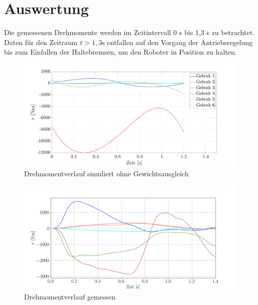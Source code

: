 \section{Auswertung}
Die gemessenen Drehmomente werden im Zeitintervall 0 s bis 1,3 s zu betrachtet. Daten für den Zeitraum $t>1,3\text{s}$ entfallen auf den Vorgang der Antriebsregelung bis zum Einfallen der Haltebremsen, um den Roboter in Position zu halten. 
%
\begin{figure}[tbph]
	\centering
	\includegraphics[width=1\linewidth]{images/taumat}
	\caption{Drehmomentverlauf simuliert ohne Gewichtsausgleich}
	\label{fig:taumat}
\end{figure}
%
\begin{figure}[tbph]
	\centering
	\includegraphics[width=1\linewidth]{images/tau}
	\caption{Drehmomentverlauf gemessen}
	\label{fig:tau}
\end{figure}
%
